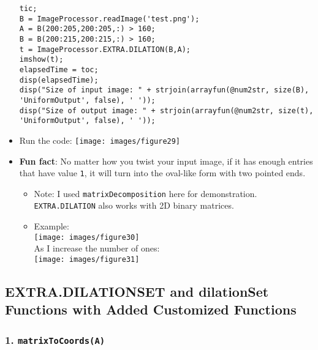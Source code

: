 \documentclass[11pt]{amsart}
\theoremstyle{remark}
\providecommand{\tightlist}{%
  \setlength{\itemsep}{0pt}\setlength{\parskip}{0pt}}
\theoremstyle{definition}
\theoremstyle{remark}
\numberwithin{equation}{section}
\begin{document}
\begin{itemize}
\begin{verbatim}
tic;
B = ImageProcessor.readImage('test.png');
A = B(200:205,200:205,:) > 160;
B = B(200:215,200:215,:) > 160;
t = ImageProcessor.EXTRA.DILATION(B,A);
imshow(t);
elapsedTime = toc;
disp(elapsedTime);
disp("Size of input image: " + strjoin(arrayfun(@num2str, size(B), 'UniformOutput', false), ' '));
disp("Size of output image: " + strjoin(arrayfun(@num2str, size(t), 'UniformOutput', false), ' '));
\end{verbatim}
\item
  Run the code:
  \texttt{[image: images/figure29]}\\
\item
  \textbf{Fun fact}: No matter how you twist your input image, if it has
  enough entries that have value \texttt{1}, it will turn into the
  oval-like form with two pointed ends.

  \begin{itemize}
  \tightlist
  \item
    Note: I used \texttt{matrixDecomposition} here for demonstration.
    \texttt{EXTRA.DILATION} also works with 2D binary matrices.
  \item
    Example:\\
    \texttt{[image: images/figure30]}\\
    As I increase the number of ones:\\
    \texttt{[image: images/figure31]}
  \end{itemize}
\end{itemize}

\subsection{EXTRA.DILATIONSET and dilationSet Functions with Added
Customized
Functions}\label{extra.dilationset-and-dilationset-functions-with-added-customized-functions}

\subsubsection{\texorpdfstring{1.
\textbf{\texttt{matrixToCoords(A)}}}{1. matrixToCoords(A)}}\label{matrixtocoordsa}
\end{document}
